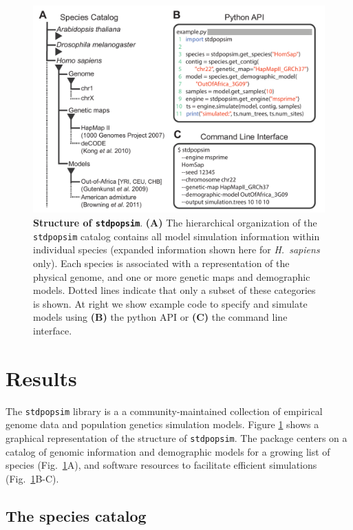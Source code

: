 \documentclass[12pt,halfline,a4paper]{ouparticle}
\newcommand{\stdpopsim}{\texttt{stdpopsim}\xspace}
\begin{document}
\begin{figure}[t]
\begin{center}
\includegraphics[width=0.7\linewidth]{display_items/Figure1.pdf}
    \caption{\textbf{Structure of \stdpopsim}. \textbf{(A)} The
hierarchical organization of the \stdpopsim catalog contains all model simulation information
within individual species (expanded information shown here for \textit{H.~sapiens} only).
Each species is associated with a representation of the physical genome, and one or more genetic maps and demographic models.
Dotted lines indicate that only a subset of these categories is shown.
At right we show example code to specify
and simulate models using \textbf{(B)} the python API or \textbf{(C)} the command line interface.
    }
\label{fig:cartoon}
\end{center}
\end{figure}

\section*{Results}

The \stdpopsim library is a
a community-maintained collection of empirical genome data and population genetics simulation models.
Figure \ref{fig:cartoon} shows a graphical representation of the structure of \stdpopsim.
The package centers on a catalog of genomic information and demographic models
for a growing list of species (Fig.~\ref{fig:cartoon}A), 
and software resources to facilitate efficient simulations (Fig.~\ref{fig:cartoon}B-C).

\subsection*{The species catalog}
\end{document}
